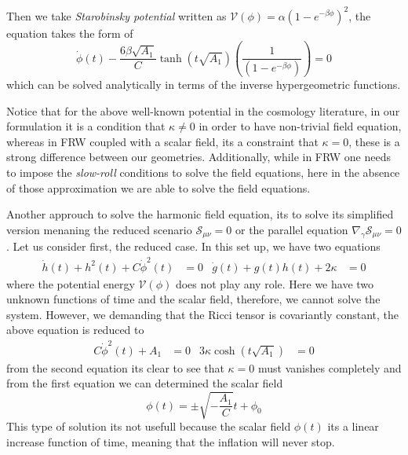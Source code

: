 \documentclass[10pt,a4paper]{article}
\begin{document}
Then we take \textit{Starobinsky potential} written as $\mathcal{V}(\phi) =  \alpha \left(1 - e^{-\beta\phi}\right)^2$, the equation takes
the form of
\begin{equation}
  \dot{\phi}(t) - \frac{6\beta\sqrt{A_1}}{C}\tanh\left(t\sqrt{A_1}\right)\left(\frac{1}{\left(1 - e^{-\beta\phi}\right)}\right) = 0
\end{equation}
which can be solved analytically in terms of the inverse hypergeometric functions.

Notice that for the above well-known potential in the cosmology literature, in our formulation it is a condition that $\kappa \neq 0$ in order
to have non-trivial field equation, whereas in FRW coupled with a scalar field, its a constraint that $\kappa = 0$, these is a strong difference
between our geometries. Additionally, while in FRW one needs to impose the \textit{slow-roll} conditions to solve the field equations, here
in the absence of those approximation we are able to solve the field equations.

Another approuch to solve the harmonic field equation, its to solve its simplified version menaning the reduced scenario $\mathcal{S}_{\mu\nu} = 0$
or the parallel equation $\nabla_\gamma\mathcal{S}_{\mu\nu} = 0$. Let us consider first, the reduced case. In this set up, we have two equations
\begin{align}
  \dot{h}(t) + h^2(t) + C\dot{\phi}^2(t) & = 0 & \dot{g}(t) + g(t)h(t) + 2\kappa & = 0
\end{align}
where the potential energy $\mathcal{V}(\phi)$ does not play any role. Here we have two unknown functions of time and the scalar field, therefore, we 
cannot solve the system. However, we demanding that the Ricci tensor is covariantly constant, the above equation is reduced to
\begin{align}
  C\dot{\phi}^2(t) + A_1 & = 0 & 3\kappa \cosh(t\sqrt{A_1}) & = 0
\end{align}
from the second equation its clear to see that $\kappa = 0$ must vanishes completely and from the first equation we can determined
the scalar field
\begin{equation}
  \phi(t) = \pm\sqrt{-\frac{A_1}{C}}t + \phi_0
\end{equation}
This type of solution its not usefull because the scalar field $\phi(t)$ its a linear increase function of time, meaning that the inflation
will never stop. 
\end{document}
